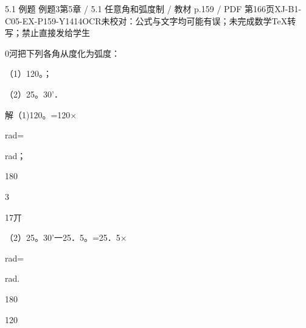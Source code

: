 \begin{bankitem}{5.1 例题 例题3}{第5章 / 5.1 任意角和弧度制 / 教材 p.159 / PDF 第166页}{XJ-B1-C05-EX-P159-Y1414}{OCR未校对：公式与文字均可能有误；未完成数学TeX转写；禁止直接发给学生}
\begin{ocrdraft}
\par
0河把下列各角从度化为弧度：
\par
（1）120。；
\par
（2）25。30'．
\par
解（1)120。=120\ensuremath{\times}
\par
rad=
\par
rad；
\par
180
\par
3
\par
17丌
\par
（2）25。30'一25．5。=25．5\ensuremath{\times}
\par
rad=
\par
rad.
\par
180
\par
120
\end{ocrdraft}
\end{bankitem}
